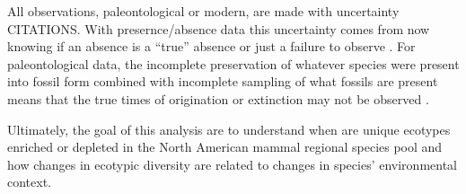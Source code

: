 \documentclass[12pt,letterpaper]{article}
\begin{document}
All observations, paleontological or modern, are made with uncertainty CITATIONS. With presernce/absence data this uncertainty comes from now knowing if an absence is a ``true'' absence or just a failure to observe \citep{Royle2008,Royle2014,Foote1999a,Foote2001,Lloyd2011,Wang2016b}. For paleontological data, the incomplete preservation of whatever species were present into fossil form combined with incomplete sampling of what fossils are present means that the true times of origination or extinction may not be observed \citep{Foote1999a,Foote2001,Wang2015,Wang2016b}.










Ultimately, the goal of this analysis are to understand when are unique ecotypes enriched or depleted in the North American mammal regional species pool and how changes in ecotypic diversity are related to changes in species' environmental context.
\end{document}
